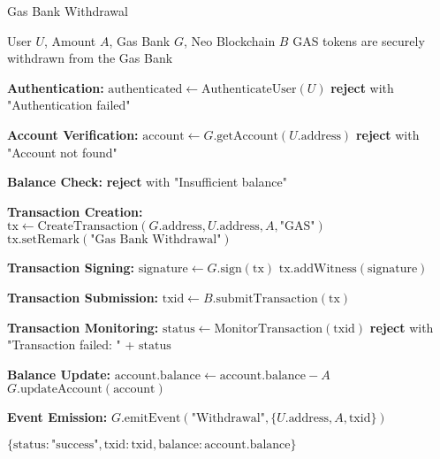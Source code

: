 \begin{tcolorbox}[
    enhanced,
    colback=blue!5!white,
    colframe=blue!75!black,
    arc=5mm,
    boxrule=1.5pt,
    title=Gas Bank Withdrawal Protocol,
    fonttitle=\bfseries,
    coltitle=white,
    attach boxed title to top left={yshift=-2mm, xshift=5mm},
    boxed title style={colback=blue!75!black, rounded corners},
    shadow={2mm}{-2mm}{0mm}{black!50},
    drop fuzzy shadow
]
\begin{protocol}{Gas Bank Withdrawal}
\label{prot:gas-bank-withdrawal}
\begin{algorithmic}[1]
\Require User $U$, Amount $A$, Gas Bank $G$, Neo Blockchain $B$
\Ensure GAS tokens are securely withdrawn from the Gas Bank

\State \textbf{Authentication:}
\State $\text{authenticated} \gets \text{AuthenticateUser}(U)$
    \State \textbf{reject} with "Authentication failed"
\EndIf

\State \textbf{Account Verification:}
\State $\text{account} \gets G.\text{getAccount}(U.\text{address})$
    \State \textbf{reject} with "Account not found"
\EndIf

\State \textbf{Balance Check:}
    \State \textbf{reject} with "Insufficient balance"
\EndIf

\State \textbf{Transaction Creation:}
\State $\text{tx} \gets \text{CreateTransaction}(G.\text{address}, U.\text{address}, A, \text{"GAS"})$
\State $\text{tx}.\text{setRemark}(\text{"Gas Bank Withdrawal"})$

\State \textbf{Transaction Signing:}
\State $\text{signature} \gets G.\text{sign}(\text{tx})$
\State $\text{tx}.\text{addWitness}(\text{signature})$

\State \textbf{Transaction Submission:}
\State $\text{txid} \gets B.\text{submitTransaction}(\text{tx})$

\State \textbf{Transaction Monitoring:}
\State $\text{status} \gets \text{MonitorTransaction}(\text{txid})$
    \State \textbf{reject} with "Transaction failed: " + $\text{status}$
\EndIf

\State \textbf{Balance Update:}
\State $\text{account}.\text{balance} \gets \text{account}.\text{balance} - A$
\State $G.\text{updateAccount}(\text{account})$

\State \textbf{Event Emission:}
\State $G.\text{emitEvent}(\text{"Withdrawal"}, \{U.\text{address}, A, \text{txid}\})$

\State \Return $\{\text{status}: \text{"success"}, \text{txid}: \text{txid}, \text{balance}: \text{account}.\text{balance}\}$
\end{algorithmic}
\end{protocol}
\end{tcolorbox}

